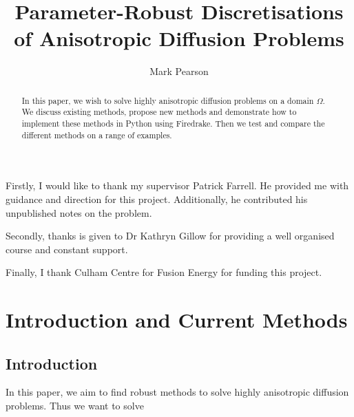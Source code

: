 \documentclass[12pt]{ociamthesis}
\title{Parameter-Robust Discretisations of Anisotropic 
Diffusion Problems}
\author{Mark Pearson}
\begin{document}
\maketitle

\thispagestyle{empty}

\newpage

\begin{acknowledgements} 

Firstly, I would like to thank my supervisor Patrick Farrell. He provided me with guidance and direction for this project. Additionally, he contributed his unpublished notes on the problem.

Secondly, thanks is given to Dr Kathryn Gillow for providing a well organised course and constant support.

Finally, I thank Culham Centre for Fusion Energy for funding this project. 

\end{acknowledgements}

\newpage

\begin{abstract}
In this paper, we wish to solve highly anisotropic diffusion problems on a domain $\Omega$. We discuss existing methods, propose new methods and demonstrate how to implement these methods in Python using Firedrake. Then we test and compare the different methods on a range of examples.
\end{abstract}

\newpage
\setcounter{page}{1}

\tableofcontents


\chapter{Introduction and Current Methods}
\section{Introduction}
In this paper, we aim to find robust methods to solve highly anisotropic diffusion problems. Thus we want to solve
\end{document}
